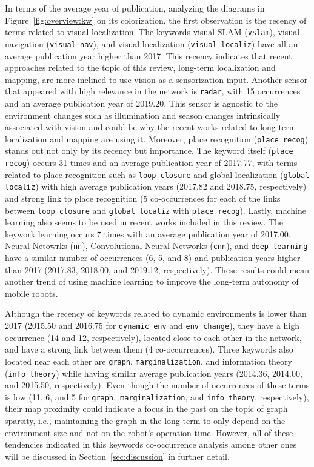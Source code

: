 In terms of the average year of publication, analyzing the diagrams in Figure~\ref{fig:overview:kw} on its colorization, the first observation is the recency of terms related to visual localization. The keywords visual SLAM (\texttt{vslam}), visual navigation (\texttt{visual nav}), and visual localization (\texttt{visual localiz}) have all an average publication year higher than 2017. This recency indicates that recent approaches related to the topic of this review, long-term localization and mapping, are more inclined to use vision as a sensorization input.
Another sensor that appeared with high relevance in the network is \texttt{radar}, with 15 occurrences and an average publication year of 2019.20. This sensor is agnostic to the environment changes such as illumination and season changes intrinsically associated with vision and could be why the recent works related to long-term localization and mapping are using it.
Moreover, place recognition (\texttt{place recog}) stands out not only by its recency but importance. The keyword itself (\texttt{place recog}) occurs 31 times and an average publication year of 2017.77, with terms related to place recognition such as \texttt{loop closure} and global localization (\texttt{global localiz}) with high average publication years (2017.82 and 2018.75, respectively) and strong link to place recognition (5 co-occurrences for each of the links between \texttt{loop closure} and \texttt{global localiz} with \texttt{place recog}). Lastly, machine learning also seems to be used in recent works included in this review. The keywork learning occurs 7 times with an average publication year of 2017.00. Neural Netowrks (\texttt{nn}), Convolutional Neural Networks (\texttt{cnn}), and \texttt{deep learning} have a similar number of occurrences (6, 5, and 8) and publication years higher than 2017 (2017.83, 2018.00, and 2019.12, respectively). These results could mean another trend of using machine learning to improve the long-term autonomy of mobile robots.

Although the recency of keywords related to dynamic environments is lower than 2017 (2015.50 and 2016.75 for \texttt{dynamic env} and \texttt{env change}), they have a high occurrence (14 and 12, respectively), located close to each other in the network, and have a strong link between them (4 co-occurrences). Three keywords also located near each other are \texttt{graph}, \texttt{marginalization}, and information theory (\texttt{info theory}) while having similar average publication years (2014.36, 2014.00, and 2015.50, respectively). Even though the number of occurrences of these terms is low (11, 6, and 5 for \texttt{graph},\texttt{ marginalization}, and \texttt{info theory}, respectively), their map proximity could indicate a focus in the past on the topic of graph sparsity, i.e., maintaining the graph in the long-term to only depend on the environment size and not on the robot's operation time. However, all of these tendencies indicated in this keywords co-occurrence analysis among other ones will be discussed in Section~\ref{sec:discussion} in further detail.

